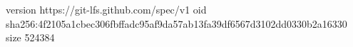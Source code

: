 version https://git-lfs.github.com/spec/v1
oid sha256:4f2105a1cbec306fbffadc95af9da57ab13fa39df6567d3102dd0330b2a16330
size 524384
